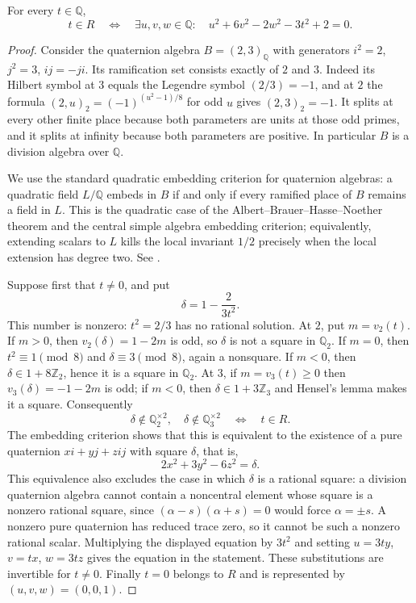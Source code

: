 \begin{proposition}\label{prop:explicit-semilocal}
For every $t\in\mathbb Q$,
\[
 t\in R\quad\Longleftrightarrow\quad
 \exists u,v,w\in\mathbb Q:\quad
 u^2+6v^2-2w^2-3t^2+2=0.
\]
\end{proposition}
\begin{proof}
Consider the quaternion algebra $B=(2,3)_{\mathbb Q}$ with generators
$i^2=2$, $j^2=3$, $ij=-ji$. Its ramification set consists exactly of
$2$ and $3$. Indeed its Hilbert symbol at $3$ equals the Legendre symbol
$(2/3)=-1$, and at $2$ the formula
$(2,u)_2=(-1)^{(u^2-1)/8}$ for odd $u$ gives $(2,3)_2=-1$.
It splits at every other finite place because both parameters are units
at those odd primes, and it splits at
infinity because both parameters are positive. In particular $B$ is a
division algebra over $\mathbb Q$.

We use the standard quadratic embedding criterion for quaternion algebras:
a quadratic field $L/\mathbb Q$ embeds in $B$ if and only if every ramified
place of $B$ remains a field in $L$. This is the quadratic case of the
Albert--Brauer--Hasse--Noether theorem and the central simple algebra
embedding criterion; equivalently, extending scalars to $L$ kills the
local invariant $1/2$ precisely when the local extension has degree two.
See \cite[Chapter 14]{Voight2021}.

Suppose first that $t\ne0$, and put
\[
 \delta=1-\frac{2}{3t^2}.
\]
This number is nonzero: $t^2=2/3$ has no rational solution.
At $2$, put $m=v_2(t)$. If $m>0$, then $v_2(\delta)=1-2m$ is odd,
so $\delta$ is not a square in $\mathbb Q_2$. If $m=0$, then
$t^2\equiv1\pmod8$ and $\delta\equiv3\pmod8$, again a nonsquare.
If $m<0$, then $\delta\in1+8\mathbb Z_2$, hence it is a square in
$\mathbb Q_2$. At $3$, if $m=v_3(t)\ge0$ then
$v_3(\delta)=-1-2m$ is odd; if $m<0$, then
$\delta\in1+3\mathbb Z_3$ and Hensel's lemma makes it a square.
Consequently
\[
 \delta\notin\mathbb Q_2^{\times2},\quad
 \delta\notin\mathbb Q_3^{\times2}
 \quad\Longleftrightarrow\quad t\in R.
\]
The embedding criterion shows that this is equivalent to the existence
of a pure quaternion $xi+yj+zij$ with square $\delta$, that is,
\[
 2x^2+3y^2-6z^2=\delta.
\]
This equivalence also excludes the case in which $\delta$ is a rational
square: a division quaternion algebra cannot contain a noncentral element
whose square is a nonzero rational square, since
$(\alpha-s)(\alpha+s)=0$ would force $\alpha=\pm s$.
A nonzero pure quaternion has reduced trace zero, so it cannot be such
a nonzero rational scalar.
Multiplying the displayed equation by $3t^2$ and setting
$u=3ty$, $v=tx$, $w=3tz$ gives the equation in the statement.
These substitutions are invertible for $t\ne0$.
Finally $t=0$ belongs to $R$ and is represented by $(u,v,w)=(0,0,1)$.
\end{proof}

